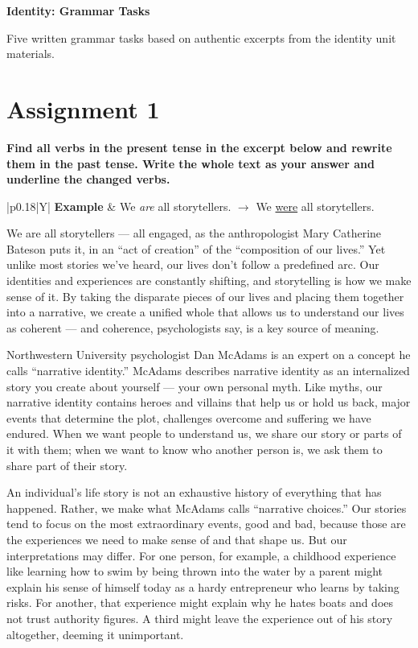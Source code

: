 \documentclass[11pt,a4paper]{article}
\newenvironment{excerpt}{%
  \def\FrameCommand{\fboxsep=8pt\colorbox{lightblue}}%
  \MakeFramed{\advance\hsize-2\width\FrameRestore}%
}{\endMakeFramed}
\newcommand{\source}[1]{\hfill{\footnotesize\emph{#1}}}
\begin{document}
{\sffamily\bfseries\Huge\color{hgblue} Identity: Grammar Tasks}\par
\vspace{0.5em}
{\large Five written grammar tasks based on authentic excerpts from the identity unit materials.}\par
\vspace{1em}

\section{Assignment 1}

\textbf{Find all verbs in the present tense in the excerpt below and rewrite them in the past tense. Write the whole text as your answer and underline the changed verbs.}

\begin{tabularx}{\textwidth}{|p{}|Y|}
\hline
\textbf{Example} & We \emph{are} all storytellers. $\rightarrow$ We \uline{were} all storytellers. \\
\hline
\end{tabularx}

\begin{excerpt}
We are all storytellers — all engaged, as the anthropologist Mary Catherine Bateson puts it, in an “act of creation” of the “composition of our lives.” Yet unlike most stories we’ve heard, our lives don’t follow a predefined arc. Our identities and experiences are constantly shifting, and storytelling is how we make sense of it. By taking the disparate pieces of our lives and placing them together into a narrative, we create a unified whole that allows us to understand our lives as coherent — and coherence, psychologists say, is a key source of meaning.

Northwestern University psychologist Dan McAdams is an expert on a concept he calls “narrative identity.” McAdams describes narrative identity as an internalized story you create about yourself — your own personal myth. Like myths, our narrative identity contains heroes and villains that help us or hold us back, major events that determine the plot, challenges overcome and suffering we have endured. When we want people to understand us, we share our story or parts of it with them; when we want to know who another person is, we ask them to share part of their story.

An individual’s life story is not an exhaustive history of everything that has happened. Rather, we make what McAdams calls “narrative choices.” Our stories tend to focus on the most extraordinary events, good and bad, because those are the experiences we need to make sense of and that shape us. But our interpretations may differ. For one person, for example, a childhood experience like learning how to swim by being thrown into the water by a parent might explain his sense of himself today as a hardy entrepreneur who learns by taking risks. For another, that experience might explain why he hates boats and does not trust authority figures. A third might leave the experience out of his story altogether, deeming it unimportant.

\end{excerpt}
\end{document}
